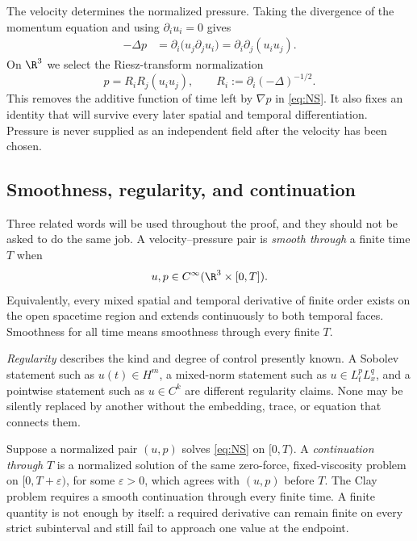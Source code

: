 The velocity determines the normalized pressure.  Taking the divergence of
the momentum equation and using \(\partial_i u_i=0\) gives
\begin{align*}
 -\Delta p
 &=\partial_i\bigl(u_j\partial_j u_i\bigr)
   =\partial_i\partial_j(u_i u_j).
\end{align*}
On \(\R^3\) we select the Riesz-transform normalization
\begin{equation}
 p=R_iR_j(u_i u_j),
 \qquad
 R_i:=\partial_i(-\Delta)^{-1/2}.
 \label{eq:pressure}
\end{equation}
This removes the additive function of time left by \(\nabla p\) in
\eqref{eq:NS}.  It also fixes an identity that will survive every later
spatial and temporal differentiation.  Pressure is never supplied as an
independent field after the velocity has been chosen.

\subsection{Smoothness, regularity, and continuation}

Three related words will be used throughout the proof, and they should not be
asked to do the same job.  A velocity--pressure pair is \emph{smooth through}
a finite time \(T\) when
\begin{equation*}
 u,p\in C^\infty(\R^3\times[0,T]).
\end{equation*}
Equivalently, every mixed spatial and temporal derivative of finite order
exists on the open spacetime region and extends continuously to both temporal
faces.  Smoothness for all time means smoothness through every finite \(T\).

\emph{Regularity} describes the kind and degree of control presently known.
A Sobolev statement such as \(u(t)\in H^m\), a mixed-norm statement such as
\(u\in L^p_tL^q_x\), and a pointwise statement such as
\(u\in C^k\) are different regularity claims.  None may be silently replaced
by another without the embedding, trace, or equation that connects them.

Suppose a normalized pair \((u,p)\) solves \eqref{eq:NS} on
\([0,T)\).  A \emph{continuation through} \(T\) is a normalized solution of
the same zero-force, fixed-viscosity problem on \([0,T+\varepsilon)\), for
some \(\varepsilon>0\), which agrees with \((u,p)\) before \(T\).  The Clay
problem requires a smooth continuation through every finite time.  A finite
quantity is not enough by itself: a required derivative can remain
finite on every strict subinterval and still fail to approach one value at the
endpoint.

